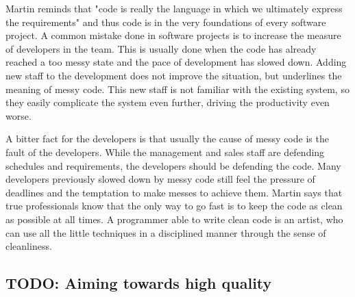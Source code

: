  Martin reminds that "code is really the language in which we ultimately express the requirements" and thus code is in the very foundations of every software project. A common mistake done in software projects is to increase the measure of developers in the team. This is usually done when the code has already reached a too messy state and the pace of development has slowed down. Adding new staff to the development does not improve the situation, but underlines the meaning of messy code. This new staff is not familiar with the existing system, so they easily complicate the system even further, driving the productivity even worse.

 A bitter fact for the developers is that usually the cause of messy code is the fault of the developers. While the management and sales staff are defending schedules and requirements, the developers should be defending the code. Many developers previously slowed down by messy code still feel the pressure of deadlines and the temptation to make messes to achieve them. Martin says that true professionals know that the only way to go fast is to keep the code as clean as possible at all times. A programmer able to write clean code is an artist, who can use all the little techniques in a disciplined manner through the sense of cleanliness.~\cite{martin2008clean}




\subsection{TODO: Aiming towards high quality}









  
 
